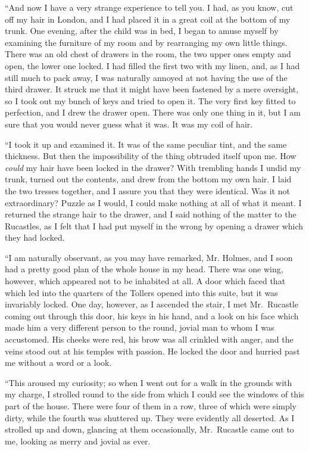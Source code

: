 “And now I have a very strange experience to tell you. I
had, as you know, cut off my hair in London, and I had
placed it in a great coil at the bottom of my trunk. One
evening, after the child was in bed, I began to amuse myself
by examining the furniture of my room and by rearranging
my own little things. There was an old chest of drawers in
the room, the two upper ones empty and open, the lower one
locked. I had filled the first two with my linen, and, as I had
still much to pack away, I was naturally annoyed at not having
the use of the third drawer. It struck me that it might
have been fastened by a mere oversight, so I took out my
bunch of keys and tried to open it. The very first key fitted
to perfection, and I drew the drawer open. There was only
one thing in it, but I am sure that you would never guess what
it was. It was my coil of hair.

“I took it up and examined it. It was of the same peculiar
tint, and the same thickness. But then the impossibility of
the thing obtruded itself upon me. How \textit{could} my hair have
been locked in the drawer? With trembling hands I undid
my trunk, turned out the contents, and drew from the bottom
my own hair. I laid the two tresses together, and I assure
you that they were identical. Was it not extraordinary? Puzzle
as I would, I could make nothing at all of what it meant.
I returned the strange hair to the drawer, and I said nothing
of the matter to the Rucastles, as I felt that I had put
myself in the wrong by opening a drawer which they had
locked.

“I am naturally observant, as you may have remarked, Mr.
Holmes, and I soon had a pretty good plan of the whole
house in my head. There was one wing, however, which appeared
not to be inhabited at all. A door which faced that
which led into the quarters of the Tollers opened into this
suite, but it was invariably locked. One day, however, as I
ascended the stair, I met Mr.~Rucastle coming out through
this door, his keys in his hand, and a look on his face which
made him a very different person to the round, jovial man to
whom I was accustomed. His cheeks were red, his brow was
all crinkled with anger, and the veins stood out at his temples
with passion. He locked the door and hurried past me without
a word or a look.

“This aroused my curiosity; so when I went out for a walk
in the grounds with my charge, I strolled round to the side
from which I could see the windows of this part of the house.
There were four of them in a row, three of which were simply
dirty, while the fourth was shuttered up. They were evidently
all deserted. As I strolled up and down, glancing at them
occasionally, Mr.~Rucastle came out to me, looking as merry
and jovial as ever.


